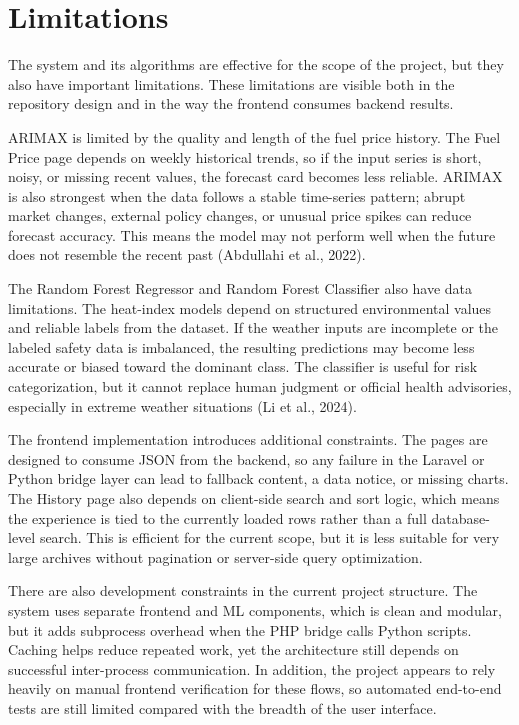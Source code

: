 \documentclass[12pt]{article}
\begin{document}
\section{Limitations}

The system and its algorithms are effective for the scope of the project, but they also have important limitations. These limitations are visible both in the repository design and in the way the frontend consumes backend results.

ARIMAX is limited by the quality and length of the fuel price history. The Fuel Price page depends on weekly historical trends, so if the input series is short, noisy, or missing recent values, the forecast card becomes less reliable. ARIMAX is also strongest when the data follows a stable time-series pattern; abrupt market changes, external policy changes, or unusual price spikes can reduce forecast accuracy. This means the model may not perform well when the future does not resemble the recent past (Abdullahi et al., 2022).

The Random Forest Regressor and Random Forest Classifier also have data limitations. The heat-index models depend on structured environmental values and reliable labels from the dataset. If the weather inputs are incomplete or the labeled safety data is imbalanced, the resulting predictions may become less accurate or biased toward the dominant class. The classifier is useful for risk categorization, but it cannot replace human judgment or official health advisories, especially in extreme weather situations (Li et al., 2024).

The frontend implementation introduces additional constraints. The pages are designed to consume JSON from the backend, so any failure in the Laravel or Python bridge layer can lead to fallback content, a data notice, or missing charts. The History page also depends on client-side search and sort logic, which means the experience is tied to the currently loaded rows rather than a full database-level search. This is efficient for the current scope, but it is less suitable for very large archives without pagination or server-side query optimization.

There are also development constraints in the current project structure. The system uses separate frontend and ML components, which is clean and modular, but it adds subprocess overhead when the PHP bridge calls Python scripts. Caching helps reduce repeated work, yet the architecture still depends on successful inter-process communication. In addition, the project appears to rely heavily on manual frontend verification for these flows, so automated end-to-end tests are still limited compared with the breadth of the user interface.
\end{document}
